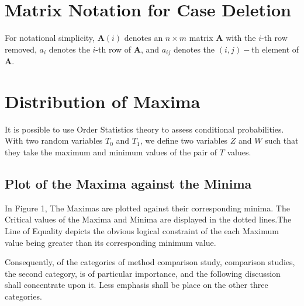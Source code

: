 \documentclass[12pt, a4paper]{report}
\theoremstyle{plain}
\theoremstyle{definition}
\theoremstyle{remark}
\begin{document}



\section{Matrix Notation for Case Deletion} %


For notational simplicity, $\boldsymbol{A}(i)$ denotes an $n \times m$ matrix $\boldsymbol{A}$ with the $i$-th row
removed, $a_i$ denotes the $i$-th row of $\boldsymbol{A}$, and $a_{ij}$ denotes the $(i, j)-$th element of $\boldsymbol{A}$.
%



\section{Distribution of Maxima} It is possible to use Order
Statistics theory to assess conditional probabilities. With two
random variables $T_{0}$ and $T_{1}$, we define two variables $Z$
and $W$ such that they take the maximum and minimum values of the
pair of $T$ values.

\subsection{Plot of the Maxima against the Minima}


In Figure 1,  The Maximas are plotted against their corresponding
minima. The Critical values of the Maxima and Minima are displayed
in the dotted lines.The Line of Equality depicts the obvious
logical constraint of the each Maximum value being greater than
its corresponding minimum value.




Consequently, of the categories of method comparison study,
comparison studies, the second category, is of particular
importance, and the following discussion shall concentrate upon
it. Less emphasis shall be place on the other three categories.
\end{document}
